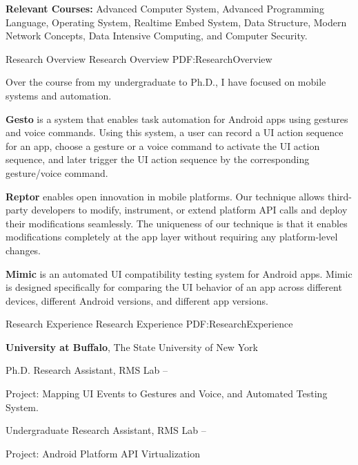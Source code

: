 \documentclass[letterpaper,MMMyyyy,nonstopmode]{simpleresumecv}
\begin{document}
\begin{Body}
\BigGap
\Entry
\textbf{Relevant Courses:} Advanced Computer System, Advanced Programming Language, Operating System, Realtime Embed System,
Data Structure, Modern Network Concepts, Data Intensive Computing,  and Computer Security.


\Section
{Research Overview}
{Research Overview}
{PDF:ResearchOverview}

\Entry
Over the course from my undergraduate to Ph.D., I have focused on mobile systems and automation.

\Gap
\BulletItem
\textbf{Gesto} is a system that enables task automation for Android apps using gestures 
and voice commands. Using this system, a user can record a UI action sequence for an app, 
choose a gesture or a voice command to activate the UI action sequence, and later trigger 
the UI action sequence by the corresponding gesture/voice command.
\hfill

\Gap
\BulletItem
\textbf{Reptor} enables open innovation in mobile platforms. Our technique allows third-party 
developers to modify, instrument, or extend platform API calls and deploy their modifications 
seamlessly. The uniqueness of our technique is that it enables modifications completely at 
the app layer without requiring any platform-level changes. 
\hfill

\Gap
\BulletItem
\textbf{Mimic} is an automated UI compatibility testing system for Android apps. 
Mimic is designed specifically for comparing the UI behavior of an app across different 
devices, different Android versions, and different app versions.
\hfill



\Section
{Research Experience}
{Research Experience}
{PDF:ResearchExperience}

\Entry
\textbf{University at Buffalo}, The State University of New York

\Gap
\BulletItem
Ph.D. Research Assistant, RMS Lab
\hfill
{} --
\begin{Detail}
\SubBulletItem
Project:
Mapping UI Events to Gestures and Voice, and Automated Testing System.
\end{Detail}

\Gap
\BulletItem
Undergraduate Research Assistant, RMS Lab
\hfill
{} --
\begin{Detail}
\SubBulletItem
Project:
Android Platform API Virtualization
\end{Detail}


\end{Body}
\end{document}
